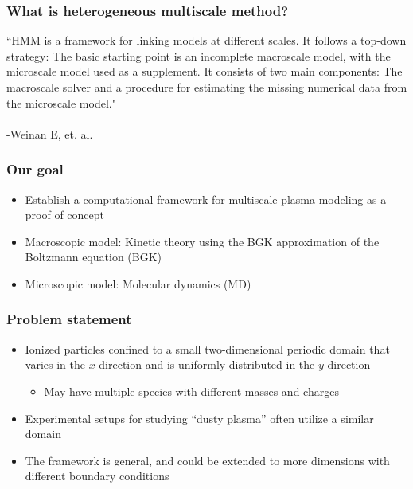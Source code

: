 \documentclass{beamer}
\begin{document}
\begin{frame}
\frametitle{What is heterogeneous multiscale method?}
``HMM is a framework for linking models at different scales. It follows a top-down strategy: The basic starting point is an incomplete macroscale model, with the microscale model used as a supplement. It consists of two main components: The macroscale solver and a procedure for estimating the missing numerical data from the microscale model."\\\hfill\\\hfill -Weinan E, et. al.
\end{frame}

\begin{frame}
\frametitle{Our goal}
\begin{itemize}

\item Establish a computational framework for multiscale plasma modeling as a proof of concept
\vspace{1em}
\item Macroscopic model: Kinetic theory using the BGK approximation of the Boltzmann equation (BGK)
\vspace{1em}
\item Microscopic model: Molecular dynamics (MD)



\end{itemize}
\end{frame}


\begin{frame}
\frametitle{Problem statement}
\begin{itemize}
\item Ionized particles confined to a small two-dimensional periodic domain that varies in the $x$ direction and is uniformly distributed in the $y$ direction\vspace{1em}
\begin{itemize}
\item May have multiple species with different masses and charges\vspace{1em}
\end{itemize}\item Experimental setups for studying ``dusty plasma'' often utilize a similar domain\vspace{1em}
\item The framework is general, and could be extended to more dimensions with different boundary conditions
\end{itemize}
\end{frame}
\end{document}
